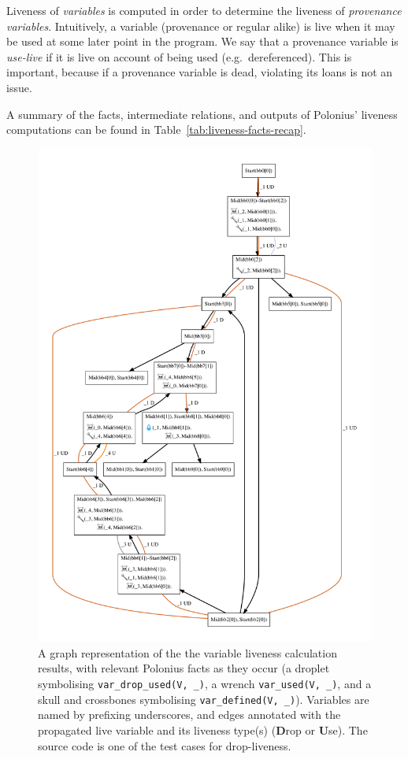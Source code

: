 \documentclass[11pt,a4paper,twoside,openany]{report}
\newcommand{\InDatalog}[1]{\texttt{#1}}
\renewcommand\_{\textunderscore\allowbreak}
\begin{document}
Liveness of \emph{variables} is computed in order to determine the liveness of
\emph{provenance variables}. Intuitively, a variable (provenance or regular
alike) is live when it may be used at some later point in the program. We say
that a provenance variable is \textit{use-live} if it is live on account of
being used (e.g.\ dereferenced). This is important, because if a provenance
variable is dead, violating its loans is not an issue.

A summary of the facts, intermediate relations, and outputs of Polonius'
liveness computations can be found in Table~\ref{tab:liveness-facts-recap}.

\begin{figure}
  \includegraphics[width=0.9\linewidth]{Graphs/liveness.pdf}
  \caption[MIR Fragment with Inputs and Outputs of the Liveness Analysis]{A
    graph representation of the the variable liveness calculation results, with
    relevant Polonius facts as they occur (a droplet symbolising
    \InDatalog{var_drop_used(V, _)}, a wrench \InDatalog{var_used(V, _)}, and a
    skull and crossbones symbolising \InDatalog{var_defined(V, _)}). Variables
    are named by prefixing underscores, and edges annotated with the propagated
    live variable and its liveness type(s) (\textbf{D}rop or \textbf{U}se). The
    source code is one of the test cases for drop-liveness.}\label{fig:liveness-graph}
\end{figure}
\end{document}
